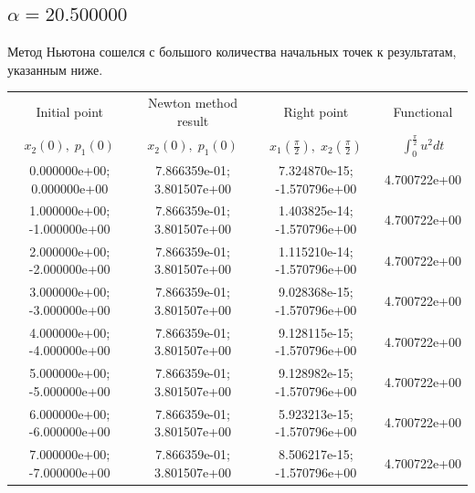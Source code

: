 \documentclass[titlepage]{article}
\def\l{\left}
\def\r{\right}
\begin{document}
\subsection{$\alpha = 20.500000$} 
Метод Ньютона сошелся с большого количества начальных точек к результатам, указанным ниже. \\ 
\begin{tabular}{ | c | c | c | c |} 
\hline 
Initial point  & Newton method result & Right point & Functional 
 \\ $x_2(0), \; p_1(0)$ & $x_2(0), \; p_1(0)$ & $x_1\l(\frac{\pi}{2}\r), \; x_2\l(\frac{\pi}{2}\r)$ & $\int_{0}^{\frac{\pi}{2}}u^2dt$  \\ \hline 
0.000000e+00; 0.000000e+00 & 7.866359e-01; 3.801507e+00 & 7.324870e-15; -1.570796e+00 & 4.700722e+00 \\ \hline 
1.000000e+00; -1.000000e+00 & 7.866359e-01; 3.801507e+00 & 1.403825e-14; -1.570796e+00 & 4.700722e+00 \\ \hline 
2.000000e+00; -2.000000e+00 & 7.866359e-01; 3.801507e+00 & 1.115210e-14; -1.570796e+00 & 4.700722e+00 \\ \hline 
3.000000e+00; -3.000000e+00 & 7.866359e-01; 3.801507e+00 & 9.028368e-15; -1.570796e+00 & 4.700722e+00 \\ \hline 
4.000000e+00; -4.000000e+00 & 7.866359e-01; 3.801507e+00 & 9.128115e-15; -1.570796e+00 & 4.700722e+00 \\ \hline 
5.000000e+00; -5.000000e+00 & 7.866359e-01; 3.801507e+00 & 9.128982e-15; -1.570796e+00 & 4.700722e+00 \\ \hline 
6.000000e+00; -6.000000e+00 & 7.866359e-01; 3.801507e+00 & 5.923213e-15; -1.570796e+00 & 4.700722e+00 \\ \hline 
7.000000e+00; -7.000000e+00 & 7.866359e-01; 3.801507e+00 & 8.506217e-15; -1.570796e+00 & 4.700722e+00 \\ \hline 
\end{tabular} 
\end{document}
